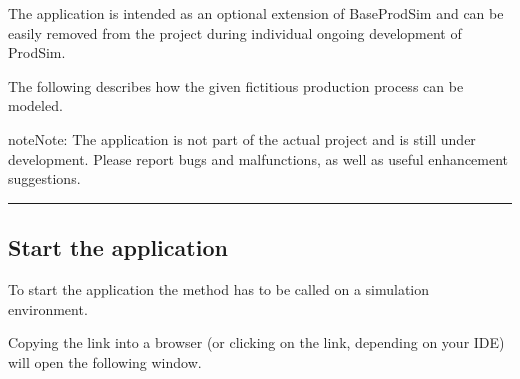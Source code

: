 \documentclass[letterpaper,10pt,english]{sphinxmanual}
\begin{document}
\sphinxAtStartPar
The application is intended as an optional extension of Base\sphinxhyphen{}ProdSim and can be easily removed from the project during
individual ongoing development of ProdSim.

\sphinxAtStartPar
The following describes how the given fictitious production process can be modeled.


\begin{sphinxadmonition}{note}{Note:}
\sphinxAtStartPar
The application is not part of the actual project and is still under development. Please report bugs and
malfunctions, as well as useful enhancement suggestions.
\end{sphinxadmonition}


\bigskip\hrule\bigskip



\subsection{Start the application}
\label{\detokenize{source/Defining_processes/defining_processes:start-the-application}}\label{\detokenize{source/Defining_processes/defining_processes:dp-call-dp}}
\sphinxAtStartPar
To start the application the method  has to be called on a simulation environment.

\begin{sphinxVerbatim}[commandchars=\\\{\}]
   

   

      

\end{sphinxVerbatim}

\sphinxAtStartPar
Copying the link into a browser (or clicking on the link, depending on your IDE) will open the following window.
\end{document}
